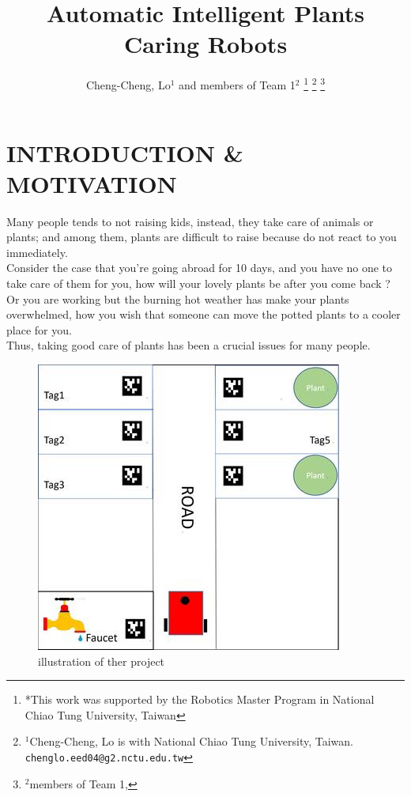 \documentclass[a4paper, 10pt, conference]{ieeeconf}      %
\title{\LARGE \bf
Automatic Intelligent Plants Caring Robots
}
\author{Cheng-Cheng, Lo$^{1}$ and members of Team 1$^{2}$%
\thanks{*This work was supported by the Robotics Master Program in National Chiao Tung University, Taiwan}%
\thanks{$^{1}$Cheng-Cheng, Lo is with National Chiao Tung University, Taiwan. 
        {\tt\small chenglo.eed04@g2.nctu.edu.tw}}%
\thanks{$^{2}$members of Team 1,
        {\tt\small}}%
}
\begin{document}
\maketitle
\thispagestyle{empty}
\pagestyle{empty}


\section{INTRODUCTION \& MOTIVATION}

\hspace*{4mm} Many people tends to not raising kids, instead, they take care of animals or plants; and among them, plants are difficult to raise because do not react to you immediately.\\
\hspace*{4mm}Consider the case that you're going abroad for 10 days, and you have no one to take care of them for you, how will your lovely plants be after you come back ?  Or you are working but the burning hot weather has make your plants overwhelmed, how you wish that someone can move the potted plants to a cooler place for you.\\
\hspace*{4mm}Thus, taking good care of plants has been a crucial issues for many people.\\

\begin{figure}[htbp] %
\includegraphics[width=0.8\columnwidth]{23602259_1745798205444844_1157434552_n.jpg}
\centering
\caption{illustration of ther project}
\end{figure}
\end{document}
